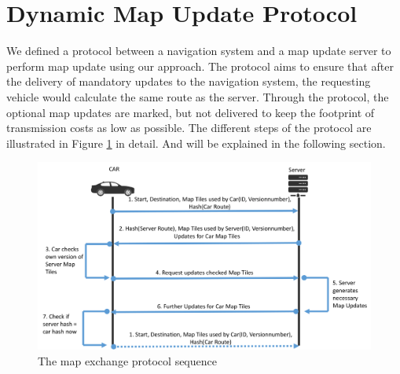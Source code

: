 \section{Dynamic Map Update Protocol}\label{protocol}
We defined a protocol between a navigation system and a map update server to perform map update using our approach. The protocol aims to ensure that after the delivery of mandatory updates to the navigation system, the requesting vehicle would calculate the same route as the server. Through the protocol, the optional map updates are marked, but not delivered to keep the footprint of transmission costs as low as possible. The different steps of the protocol are illustrated in Figure \ref{fg:protocol} in detail. And will be explained in the following section.


\begin{figure}
\centering
\includegraphics[scale=.32]{dmup.png}
\caption{The map exchange protocol sequence}
\label{fg:protocol}
\end{figure}



